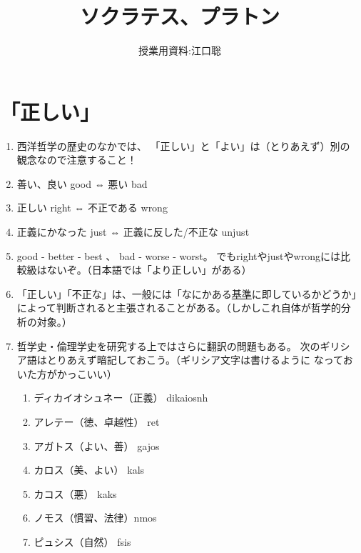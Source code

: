 \documentclass[uplatex]{bxjsarticle}
\author{授業用資料:江口聡}
\title{ソクラテス、プラトン}
\begin{document}
\maketitle

\section{「正しい」}

\begin{enumerate}

\item 西洋哲学の歴史のなかでは、
「正しい」と「よい」は（とりあえず）別の観念なので注意すること！
  
\item 善い、良い good ⇔ 悪い bad

\item 正しい right ⇔ 不正である wrong 
\item 正義にかなった just  ⇔ 正義に反した/不正な unjust

\item good - better - best 、 bad - worse - worst。
でもrightやjustやwrongには比較級はないぞ。（日本語では「より正しい」がある）

\item 「正しい」「不正な」は、一般には「なにかある\underline{基準}に即しているかどうか」によって判断されると主張されることがある。（しかしこれ自体が哲学的分析の対象。）


\item 哲学史・倫理学史を研究する上ではさらに翻訳の問題もある。
次のギリシア語はとりあえず暗記しておこう。（ギリシア文字は書けるように
なっておいた方がかっこいい）

 \begin{enumerate}
 \item ディカイオシュネー（正義） \textgreek{dikaios\ua{}nh} 
 \item アレテー（徳、卓越性） \textgreek{\as{}ret\ha{}} 
 \item アガトス（よい、善） \textgreek{\as{}gajos} 
 \item カロス（美、よい） \textgreek{kal{\oa}s}
 \item カコス（悪） \textgreek{kak\oa{}s} 
 \item ノモス（慣習、法律）\textgreek{n{\oa}mos} 
 \item ピュシス（自然） \textgreek{f{\ua}sis}
 \end{enumerate}
\fi



\end{enumerate}
\end{document}
